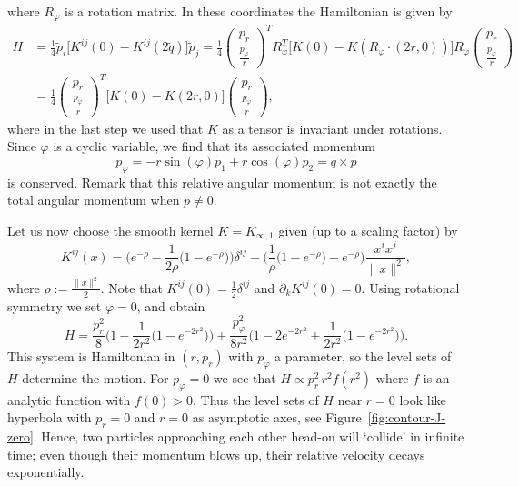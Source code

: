 \documentclass[12pt]{amsart}
\begin{document}
where $R_\varphi$ is a rotation matrix. In these coordinates the
Hamiltonian is given by
\begin{equation*}
  \begin{aligned}
  H &= \frac{1}{4} \tilde{p}_i \big[ K^{ij}(0) - K^{ij}(2\tilde{q}) \big] \tilde{p}_j
     = \frac{1}{4} \begin{pmatrix} p_r \\ \frac{p_\varphi}{r} \end{pmatrix}^T R_\varphi^T
       \big[ K(0) - K(R_\varphi\cdot(2r,0)) \big] R_\varphi
       \begin{pmatrix} p_r \\ \frac{p_\varphi}{r} \end{pmatrix}\\
    &= \frac{1}{4} \begin{pmatrix} p_r \\ \frac{p_\varphi}{r} \end{pmatrix}^T
       \big[ K(0) - K(2r,0) \big] \begin{pmatrix} p_r \\ \frac{p_\varphi}{r} \end{pmatrix},
  \end{aligned}
\end{equation*}
where in the last step we used that $K$ as a tensor is invariant under
rotations. Since $\varphi$ is a cyclic variable, we find that its
associated momentum
\begin{equation*}
  p_\varphi = -r \sin(\varphi) \tilde{p}_1 + r \cos(\varphi) \tilde{p}_2
            = \tilde{q} \times \tilde{p}
\end{equation*}
is conserved. Remark that this relative angular momentum is not
exactly the total angular momentum when $\bar{p} \neq 0$.

Let us now choose the smooth kernel $K = K_{\infty,1}$ given
(up to a scaling factor) by
%
{\newcommand{\e}{e^{-\rho}}
\begin{equation}\label{eq:smooth-kernel}
  K^{ij}(x) = \Big(\e - \frac{1}{2\rho}\big(1 - \e\big)\Big)\delta^{ij}
    + \Big(\frac{1}{\rho}\big(1 - \e\big) - \e\Big)\frac{x^i x^j}{\|x\|^2},
\end{equation}%
}%
where $\rho := \frac{\|x\|^2}{2}$. Note that
$K^{ij}(0) = \frac{1}{2} \delta^{ij}$ and $\partial_k K^{ij}(0) = 0$.
Using rotational symmetry we set $\varphi = 0$, and obtain
\begin{equation}\label{eq:H-rot-reduced}
  H = \frac{p_r^2      }{8}   \Big(1 - \frac{1}{2r^2}\big(1-e^{-2r^2}\big)\Big)
     +\frac{p_\varphi^2}{8r^2}\Big(1 - 2e^{-2r^2} + \frac{1}{2r^2}\big(1-e^{-2r^2}\big)\Big).
\end{equation}
This system is Hamiltonian in $(r,p_r)$ with $p_\varphi$ a parameter, so
the level sets of $H$ determine the motion. For $p_\varphi = 0$ we see
that $H \propto p_r^2\, r^2 f(r^2)$ where $f$ is an analytic function
with $f(0) > 0$. Thus the level sets of $H$ near $r = 0$ look like
hyperbola with $p_r = 0$ and $r = 0$ as asymptotic axes, see
Figure~\eqref{fig:contour-J-zero}. Hence, two particles approaching
each other head-on will `collide' in infinite time; even though their
momentum blows up, their relative velocity decays exponentially.
\end{document}
